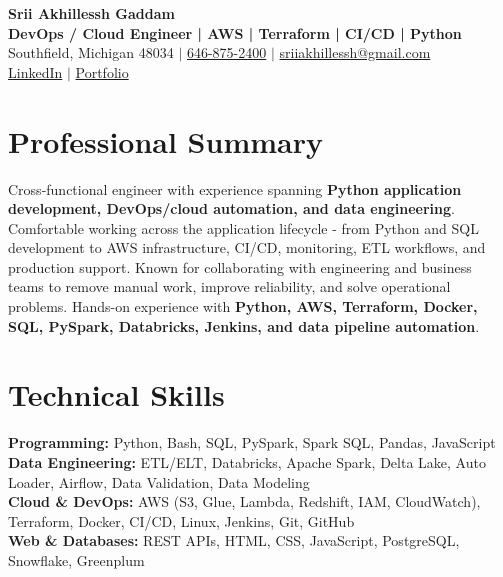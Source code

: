 \documentclass[letterpaper,10pt]{article}
\begin{document}
\fontsize{9.35pt}{10.45pt}\selectfont

\begin{center}
    {\LARGE \textbf{Srii Akhillessh Gaddam}} \\[-1pt]
    \textbf{DevOps / Cloud Engineer | AWS | Terraform | CI/CD | Python} \\[2pt]
    Southfield, Michigan 48034 $|$
    \href{tel:6468752400}{646-875-2400} $|$
    \href{mailto:sriiakhillessh@gmail.com}{sriiakhillessh@gmail.com} \\[1pt]
    \href{https://www.linkedin.com/in/srii-akhiilessh-gaddam-b48668191/}{LinkedIn} $|$
    \href{https://sriiakhillesshg.github.io/portfolio/}{Portfolio}
\end{center}
\vspace{-8pt}

\section{Professional Summary}
\small{Cross-functional engineer with experience spanning \textbf{Python application development, DevOps/cloud automation, and data engineering}. Comfortable working across the application lifecycle - from Python and SQL development to AWS infrastructure, CI/CD, monitoring, ETL workflows, and production support. Known for collaborating with engineering and business teams to remove manual work, improve reliability, and solve operational problems. Hands-on experience with \textbf{Python, AWS, Terraform, Docker, SQL, PySpark, Databricks, Jenkins, and data pipeline automation}.}

\section{Technical Skills}
\small{
\textbf{Programming:} Python, Bash, SQL, PySpark, Spark SQL, Pandas, JavaScript \\
\textbf{Data Engineering:} ETL/ELT, Databricks, Apache Spark, Delta Lake, Auto Loader, Airflow, Data Validation, Data Modeling \\
\textbf{Cloud \& DevOps:} AWS (S3, Glue, Lambda, Redshift, IAM, CloudWatch), Terraform, Docker, CI/CD, Linux, Jenkins, Git, GitHub \\
\textbf{Web \& Databases:} REST APIs, HTML, CSS, JavaScript, PostgreSQL, Snowflake, Greenplum
}
\end{document}
